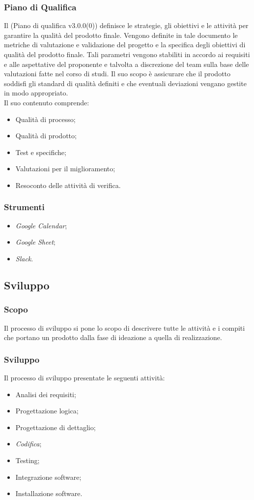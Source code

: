 \documentclass[10pt, a4paper]{article}
\begin{document}
\subsubsection{Piano di Qualifica }
Il (Piano di qualifica v3.0.0(0)) definisce le strategie, gli obiettivi e le attività per garantire la qualità del prodotto finale. Vengono definite in 
tale documento le metriche di valutazione e validazione del progetto e la specifica degli obiettivi di qualità del prodotto finale. 
Tali parametri vengono stabiliti in accordo ai requisiti e alle aspettative del proponente e talvolta a discrezione del team sulla base 
delle valutazioni fatte nel corso di studi. Il suo scopo è assicurare che il prodotto soddisfi gli standard di qualità definiti e che 
eventuali deviazioni vengano gestite in modo appropriato.\\
Il suo contenuto comprende:
\begin{itemize}
    \item Qualità di processo;
    \item Qualità di prodotto;
    \item Test e specifiche;
    \item Valutazioni per il miglioramento;
    \item Resoconto delle attività di verifica.
\end{itemize}
\subsubsection{Strumenti}
\begin{itemize}
    \item \textit{Google Calendar};
    \item \textit{Google Sheet};
    \item \textit{Slack}.
\end{itemize}

\subsection{Sviluppo}
\subsubsection{Scopo}
Il processo di sviluppo si pone lo scopo di descrivere tutte le attività e i compiti che portano un prodotto dalla fase di ideazione a quella di realizzazione. 

\subsubsection{Sviluppo}
Il processo di sviluppo presentate le seguenti attività:
\begin{itemize}
    \item Analisi dei requisiti;
    \item Progettazione logica;
    \item Progettazione di dettaglio;
    \item \textit{Codifica\pg};
    \item Testing;
    \item Integrazione software;
    \item Installazione software.
\end{itemize}
\end{document}
